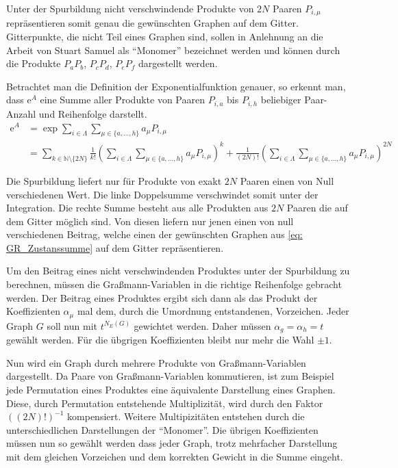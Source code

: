 \noindent Unter der Spurbildung nicht verschwindende Produkte von $2N$ Paaren $P_{i,\mu}$ repräsentieren somit genau die gewünschten Graphen auf dem Gitter. Gitterpunkte, die nicht Teil eines Graphen sind, sollen in Anlehnung an die Arbeit von Stuart Samuel als ``Monomer'' bezeichnet werden und können durch die Produkte $P_a P_b$, $P_cP_d$, $P_e P_f$ dargestellt werden. 

\noindent Betrachtet man die Definition der Exponentialfunktion genauer, so erkennt man, dass $\mathrm{e}^A$ eine Summe aller Produkte von Paaren $P_{i,a}$ bis $P_{i,h}$ beliebiger Paar-Anzahl und Reihenfolge darstellt. 
\begin{align}
\mathrm{e}^A &= \exp{\sum_{i \in\Lambda} \sum_{\mu \in \{a,\dots, h\}} a_{\mu} P_{i, \mu }} \nonumber \\
        &=\sum_{k\in\mathbb N \setminus \{2N\}} \frac{1}{k!}\left( \sum_{i \in\Lambda} \sum_{\mu \in \{a,\dots, h\}} a_{\mu} P_{i, \mu }\right)^k + \frac{1}{(2N)!} \left(\sum_{i \in\Lambda} \sum_{\mu \in \{a,\dots, h\}} a_{\mu} P_{i, \mu }\right)^{2N} \label{eq: exp_sum_combi}
\end{align}

\noindent Die Spurbildung liefert nur für Produkte von exakt $2N$ Paaren einen von Null verschiedenen Wert. Die linke Doppelsumme verschwindet somit unter der Integration. Die rechte Summe besteht aus alle Produkten aus $2N$ Paaren die auf dem Gitter möglich sind. Von diesen liefern nur jenen einen von null verschiedenen Beitrag, welche einen der gewünschten Graphen aus \eqref{eq: GR_Zustanssumme} auf dem Gitter repräsentieren.

\noindent Um den Beitrag eines nicht verschwindenden Produktes unter der Spurbildung zu berechnen, müssen die Graßmann-Variablen in die richtige Reihenfolge gebracht werden. Der Beitrag eines Produktes ergibt sich dann als das Produkt der Koeffizienten $\alpha_{\mu}$ mal dem, durch die Umordnung entstandenen, Vorzeichen. Jeder Graph $G$ soll nun mit $t^{N_E(G)}$ gewichtet werden. Daher müssen $\alpha_g = \alpha_h = t$ gewählt werden. Für die übgrigen Koeffizienten bleibt nur mehr die Wahl $\pm 1$. 

\noindent Nun wird ein Graph durch mehrere Produkte von Graßmann-Variablen dargestellt. Da Paare von Graßmann-Variablen kommutieren, ist zum Beispiel jede Permutation eines Produktes eine äquivalente Darstellung eines Graphen. Diese, durch Permutation entstehende Multiplizität, wird durch den Faktor $((2N)!)^{-1}$ kompensiert.
Weitere Multipizitäten entstehen durch die unterschiedlichen Darstellungen der ``Monomer''. Die übrigen Koeffizienten müssen nun so gewählt werden dass jeder Graph, trotz mehrfacher Darstellung mit dem gleichen Vorzeichen und dem korrekten Gewicht in die Summe eingeht.  


